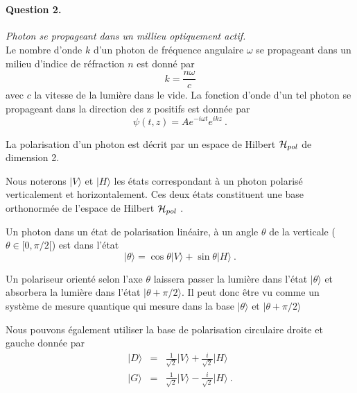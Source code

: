 \newpage
\ 
\newpage
\ 
\newpage
\ 

\paragraph{Question 2.} \textit{Photon se propageant dans un millieu optiquement actif.} \\






Le nombre d'onde $k$ d'un photon de fréquence angulaire $\omega$ se propageant dans un milieu d'indice de réfraction $n$ est donné par
\begin{equation}
k= \frac{n \omega}{c} 
\end{equation}
avec $c$ la vitesse de la lumière dans le vide.
La fonction d'onde d'un tel photon se propageant dans la direction des z positifs est donnée par
\begin{equation}
\psi(t,z) = A e^{-i \omega t} e^{i k z}\ .
\end{equation}


La polarisation d'un photon est décrit par un espace de Hilbert ${\cal H}_{pol}$ de dimension 2.

Nous noterons $\vert V\rangle$ et $\vert H\rangle$ les états correspondant à un photon polarisé verticalement et horizontalement. Ces deux états constituent une base orthonormée de l'espace de Hilbert ${\cal H}_{pol}$ .

Un photon dans un état de polarisation linéaire, à un angle $\theta$ de la verticale ($\theta \in [0,\pi/2[$) est dans l'état 
\begin{equation}
\vert \theta \rangle = \cos \theta \vert V\rangle + \sin \theta \vert H\rangle\ .
\label{eq:theta}
\end{equation}

Un polariseur orienté selon l'axe $\theta$ laissera passer la lumière dans l'état 
$\vert \theta \rangle$ et absorbera la lumière dans l'état $\vert \theta + \pi/2 \rangle$. Il peut donc être vu comme un système de mesure quantique qui mesure dans la base $\vert \theta \rangle$ et $\vert \theta +\pi/2 \rangle$


Nous pouvons également utiliser la base de polarisation circulaire droite et gauche donnée par 
\begin{eqnarray}
\vert D \rangle &=& \frac{1}{\sqrt{2}} \vert V\rangle + \frac{i}{\sqrt{2}} \vert H\rangle\nonumber\\
\vert G \rangle &=& \frac{1}{\sqrt{2}} \vert V\rangle - \frac{i}{\sqrt{2}} \vert H\rangle\ .
\end{eqnarray}



